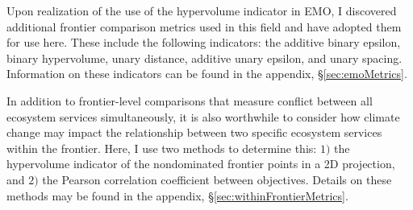 Upon realization of the use of the hypervolume indicator in EMO, I discovered additional frontier comparison metrics used in this field and have adopted them for use here. These include the following indicators: the additive binary epsilon, binary hypervolume, unary distance, additive unary epsilon, and unary spacing. Information on these indicators can be found in the appendix, \S \ref{sec:emoMetrics}.

In addition to frontier-level comparisons that measure conflict between all ecosystem services simultaneously, it is also worthwhile to consider how climate change may impact the relationship between two specific ecosystem services within the frontier. Here, I use two methods to determine this: $1)$ the hypervolume indicator of the nondominated frontier points in a 2D projection, and $2)$ the Pearson correlation coefficient between objectives. Details on these methods may be found in the appendix, \S \ref{sec:withinFrontierMetrics}.